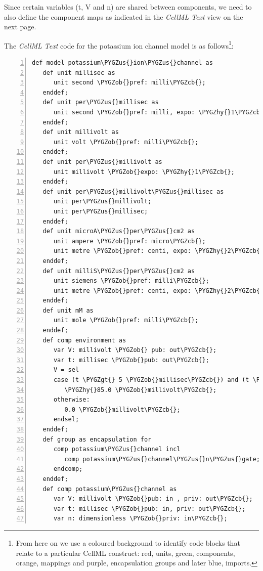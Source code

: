 \documentclass[a4paper,10pt,english]{sphinxmanual}
\renewcommand{\DUspan}[2]{#1, #2}
\def\PYGZus{\char`\_}
\def\PYGZob{\char`\{}
\def\PYGZcb{\char`\}}
\def\PYGZlt{\char`\<}
\def\PYGZgt{\char`\>}
\def\PYGZhy{\char`\-}
\begin{document}
Since certain variables (t, V and n) are shared between components, we
need to also define the component maps as indicated in the \emph{CellML Text}
view on the next page.

The \emph{CellML Text} code for the potassium ion channel model is as
follows\footnote[2]{
From here on we use a coloured background to identify code blocks that relate to a particular CellML construct: \DUspan{red}{units}, \DUspan{green}{components}, \DUspan{orange}{mappings} and \DUspan{purple}{encapsulation groups} and later \DUspan{blue}{imports}.
}:


\begin{Verbatim}[commandchars=\\\{\},numbers=left,firstnumber=1,stepnumber=1]
def model potassium\PYGZus{}ion\PYGZus{}channel as
   def unit millisec as
      unit second \PYGZob{}pref: milli\PYGZcb{};
   enddef;
   def unit per\PYGZus{}millisec as
      unit second \PYGZob{}pref: milli, expo: \PYGZhy{}1\PYGZcb{};
   enddef;
   def unit millivolt as
      unit volt \PYGZob{}pref: milli\PYGZcb{};
   enddef;
   def unit per\PYGZus{}millivolt as
      unit millivolt \PYGZob{}expo: \PYGZhy{}1\PYGZcb{};
   enddef;
   def unit per\PYGZus{}millivolt\PYGZus{}millisec as
      unit per\PYGZus{}millivolt;
      unit per\PYGZus{}millisec;
   enddef;
   def unit microA\PYGZus{}per\PYGZus{}cm2 as
      unit ampere \PYGZob{}pref: micro\PYGZcb{};
      unit metre \PYGZob{}pref: centi, expo: \PYGZhy{}2\PYGZcb{};
   enddef;
   def unit milliS\PYGZus{}per\PYGZus{}cm2 as
      unit siemens \PYGZob{}pref: milli\PYGZcb{};
      unit metre \PYGZob{}pref: centi, expo: \PYGZhy{}2\PYGZcb{};
   enddef;
   def unit mM as
      unit mole \PYGZob{}pref: milli\PYGZcb{};
   enddef;
   def comp environment as
      var V: millivolt \PYGZob{} pub: out\PYGZcb{};
      var t: millisec \PYGZob{}pub: out\PYGZcb{};
      V = sel
      case (t \PYGZgt{} 5 \PYGZob{}millisec\PYGZcb{}) and (t \PYGZlt{} 15 \PYGZob{}millisec\PYGZcb{}):
         \PYGZhy{}85.0 \PYGZob{}millivolt\PYGZcb{};
      otherwise:
         0.0 \PYGZob{}millivolt\PYGZcb{};
      endsel;
   enddef;
   def group as encapsulation for
      comp potassium\PYGZus{}channel incl
         comp potassium\PYGZus{}channel\PYGZus{}n\PYGZus{}gate;
      endcomp;
   enddef;
   def comp potassium\PYGZus{}channel as
      var V: millivolt \PYGZob{}pub: in , priv: out\PYGZcb{};
      var t: millisec \PYGZob{}pub: in, priv: out\PYGZcb{};
      var n: dimensionless \PYGZob{}priv: in\PYGZcb{};

\end{Verbatim}
\end{document}
